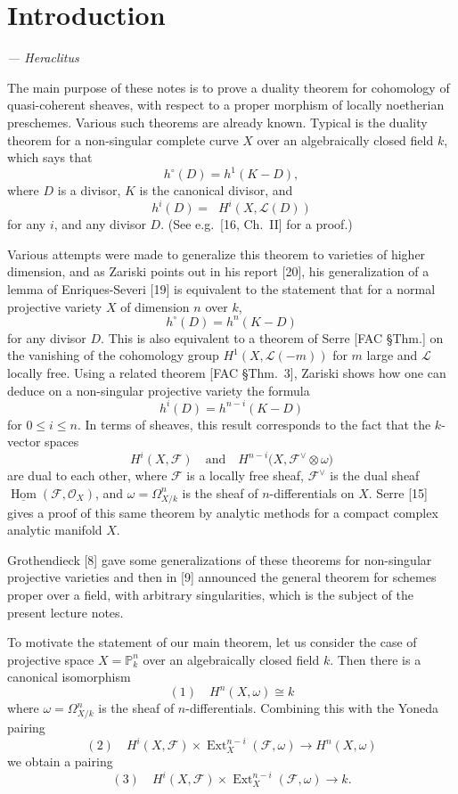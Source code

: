 \documentclass[12pt]{book}
\newcommand{\sheaf}[1]{\mathcal{#1}}
\DeclareMathOperator{\Hom}{Hom}
\DeclareMathOperator{\Ext}{Ext}
\DeclareMathOperator{\dimk}{dim_k}
\begin{document}
\chapter*{Introduction}
\textit{--- Heraclitus}

The main purpose of these notes is to prove a duality theorem for cohomology of quasi-coherent sheaves, with respect to a proper morphism of locally noetherian preschemes. Various such theorems are already known. Typical is the duality theorem for a non-singular complete curve \(X\) over an algebraically closed field \(k\), which says that
\[
h^{\circ}(D)=h^{1}(K-D),
\]
where \(D\) is a divisor, \(K\) is the canonical divisor, and
\[
h^{i}(D)=\dimk H^{i}(X,\sheaf{L}(D))
\]
for any \(i\), and any divisor \(D\). (See e.g.\ [16, Ch.~II] for a proof.)

Various attempts were made to generalize this theorem to varieties of higher dimension, and as Zariski points out in his report [20], his generalization of a lemma of Enriques-Severi [19] is equivalent to the statement that for a normal projective variety \(X\) of dimension \(n\) over \(k\),
\[
h^{\circ}(D)=h^{n}(K-D)
\]
for any divisor \(D\). This is also equivalent to a theorem of Serre [FAC \S Thm.] on the vanishing of the cohomology group \(H^{1}(X,\sheaf{L}(-m))\) for \(m\) large and \(\sheaf{L}\) locally free. Using a related theorem [FAC \S Thm.~3], Zariski shows how one can deduce on a non-singular projective variety the formula
\[
h^{i}(D)=h^{n-i}(K-D)
\]
for \(0 \le i \le n\). In terms of sheaves, this result corresponds to the fact that the \(k\)-vector spaces
\[
H^{i}(X,\sheaf{F}) \quad \text{and} \quad H^{n-i}\bigl(X,\sheaf{F}^{\vee} \otimes \omega\bigr)
\]
are dual to each other, where \(\sheaf{F}\) is a locally free sheaf, \(\sheaf{F}^{\vee}\) is the dual sheaf \(\underline{\Hom}(\sheaf{F},\sheaf{O}_X)\), and \(\omega=\Omega_{X/k}^{n}\) is the sheaf of \(n\)-differentials on \(X\). Serre [15] gives a proof of this same theorem by analytic methods for a compact complex analytic manifold \(X\).

Grothendieck [8] gave some generalizations of these theorems for non-singular projective varieties and then in [9] announced the general theorem for schemes proper over a field, with arbitrary singularities, which is the subject of the present lecture notes.

To motivate the statement of our main theorem, let us consider the case of projective space \(X = \mathbb{P}_k^n\) over an algebraically closed field \(k\). Then there is a canonical isomorphism
\[
(1)\quad H^{n}(X,\omega) \cong k
\]
where \(\omega=\Omega_{X/k}^{n}\) is the sheaf of \(n\)-differentials. Combining this with the Yoneda pairing
\[
(2)\quad H^{i}(X,\sheaf{F}) \times \Ext_{X}^{n-i}(\sheaf{F},\omega) \to H^{n}(X,\omega)
\]
we obtain a pairing
\[
(3)\quad H^{i}(X,\sheaf{F}) \times \Ext_{X}^{n-i}(\sheaf{F},\omega) \to k.
\]
\end{document}

